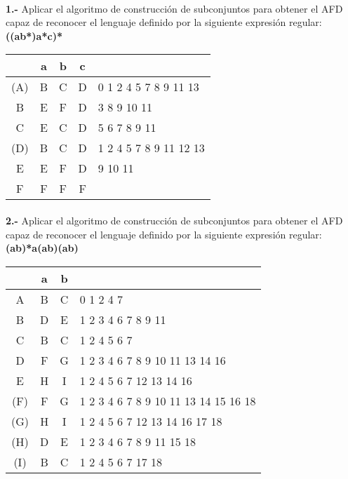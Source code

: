 \documentclass[11pt,a4paper]{report}
\begin{document}
\paragraph{}

\paragraph{}
\textbf{1.-} Aplicar el algoritmo de construcción de subconjuntos para obtener el AFD capaz de reconocer el lenguaje definido por la siguiente expresión regular: \textbf{((a\textbar b*)a*c)*} \\

\begin{tabular} {| c | c |c |c | l |}
\hline 
& a & b & c & \\ \hline
(A) & B & C & D & 0 1 2 4 5 7 8 9 11 13 \\ \hline
B & E & F & D & 3 8 9 10 11 \\ \hline
C & E & C & D & 5 6 7 8 9 11 \\ \hline
(D) & B & C & D & 1 2 4 5 7 8 9 11 12 13 \\ \hline
E & E & F & D & 9 10 11 \\ \hline
F & F & F & F & \\ \hline
\end{tabular}\paragraph{}
\textbf{2.-} Aplicar el algoritmo de construcción de subconjuntos para obtener el AFD capaz de reconocer el lenguaje definido por la siguiente expresión regular: \textbf{(a\textbar b)*a(a\textbar b)(a\textbar b)} \\

\begin{tabular} {| c | c |c | l |}
\hline 
& a & b & \\ \hline
A & B & C & 0 1 2 4 7 \\ \hline
B & D & E & 1 2 3 4 6 7 8 9 11 \\ \hline
C & B & C & 1 2 4 5 6 7 \\ \hline
D & F & G & 1 2 3 4 6 7 8 9 10 11 13 14 16 \\ \hline
E & H & I & 1 2 4 5 6 7 12 13 14 16 \\ \hline
(F) & F & G & 1 2 3 4 6 7 8 9 10 11 13 14 15 16 18 \\ \hline
(G) & H & I & 1 2 4 5 6 7 12 13 14 16 17 18 \\ \hline
(H) & D & E & 1 2 3 4 6 7 8 9 11 15 18 \\ \hline
(I) & B & C & 1 2 4 5 6 7 17 18 \\ \hline
\end{tabular}
\end{document}
